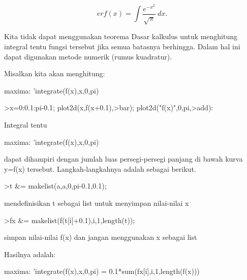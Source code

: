 \documentclass[a4paper,10pt]{article}
\begin{document}
\begin{eulernotebook}
\begin{eulercomment}
\begin{eulercomment}
\begin{eulercomment}
\begin{eulercomment}
\begin{eulercomment}
\begin{eulercomment}
\begin{eulercomment}
\begin{eulercomment}
\begin{eulercomment}
\begin{eulercomment}
\begin{eulercomment}
\begin{eulercomment}
\begin{eulercomment}
\begin{eulercomment}
\begin{eulercomment}
\begin{eulercomment}
\begin{eulercomment}
\begin{eulercomment}
\begin{eulercomment}
\begin{eulercomment}
\begin{eulercomment}
\begin{eulercomment}
\begin{eulercomment}
\begin{eulercomment}
\begin{eulercomment}
\end{eulercomment}
\begin{eulerformula}
\[
erf(x) = \int \frac{e^{-x^2}}{\sqrt{\pi}} \ dx.
\]
\end{eulerformula}
\begin{eulercomment}
Kita tidak dapat menggunakan teorema Dasar kalkulus untuk menghitung
integral tentu fungsi tersebut jika semua batasnya berhingga. Dalam
hal ini dapat digunakan metode numerik (rumus kuadratur).

Misalkan kita akan menghitung:

maxima: 'integrate(f(x),x,0,pi)
\end{eulercomment}
\begin{eulerprompt}
>x=0:0.1:pi-0.1; plot2d(x,f(x+0.1),>bar); plot2d("f(x)",0,pi,>add):
\end{eulerprompt}
\begin{eulercomment}
Integral tentu

maxima: 'integrate(f(x),x,0,pi)

dapat dihampiri dengan jumlah luas persegi-persegi panjang di bawah
kurva y=f(x) tersebut. Langkah-langkahnya adalah sebagai berikut.
\end{eulercomment}
\begin{eulerprompt}
>t &= makelist(a,a,0,pi-0.1,0.1);
\end{eulerprompt}
\begin{eulerttcomment}
 mendefinisikan t sebagai list untuk menyimpan nilai-nilai x
\end{eulerttcomment}
\begin{eulerprompt}
>fx &= makelist(f(t[i]+0.1),i,1,length(t)); 
\end{eulerprompt}
\begin{eulercomment}
simpan nilai-nilai f(x) dan jangan menggunakan x sebagai list

Hasilnya adalah:

maxima: 'integrate(f(x),x,0,pi) = 0.1*sum(fx[i],i,1,length(f(x)))


\end{eulercomment}
\end{eulercomment}
\end{eulercomment}
\end{eulercomment}
\end{eulercomment}
\end{eulercomment}
\end{eulercomment}
\end{eulercomment}
\end{eulercomment}
\end{eulercomment}
\end{eulercomment}
\end{eulercomment}
\end{eulercomment}
\end{eulercomment}
\end{eulercomment}
\end{eulercomment}
\end{eulercomment}
\end{eulercomment}
\end{eulercomment}
\end{eulercomment}
\end{eulercomment}
\end{eulercomment}
\end{eulercomment}
\end{eulercomment}
\end{eulercomment}
\end{eulernotebook}
\end{document}
